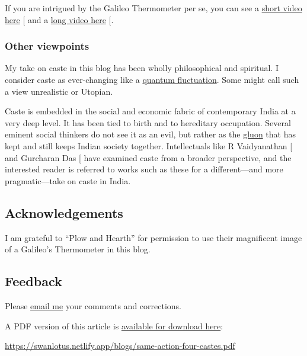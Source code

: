 \documentclass[
  a4paper,
]{article}
\begin{document}
If you are intrigued by the Galileo Thermometer per se, you can see a
\href{https://youtube.com/shorts/kkQ1TFr4apg?si=V7W3fbIZLpQ2p4ud}{short
video here} {[}\citeproc{ref-galileo-YT-short}{1}{]} and a
\href{https://www.youtube.com/watch?v=XeSlFxOHW6A}{long video here}
{[}\citeproc{ref-galileo-YT-long}{2}{]}.

\subsubsection{Other viewpoints}\label{other-viewpoints}

My take on caste in this blog has been wholly philosophical and
spiritual. I consider caste as ever-changing like a
\href{https://en.wikipedia.org/wiki/Quantum_fluctuation}{quantum
fluctuation}. Some might call such a view unrealistic or Utopian.

Caste is embedded in the social and economic fabric of contemporary
India at a very deep level. It has been tied to birth and to hereditary
occupation. Several eminent social thinkers do not see it as an evil,
but rather as the \href{https://en.wikipedia.org/wiki/Gluon}{gluon} that
has kept and still keeps Indian society together. Intellectuals like R
Vaidyanathan {[}\citeproc{ref-rv-caste}{3}{]} and Gurcharan Das
{[}\citeproc{ref-das-dharma}{4}{]} have examined caste from a broader
perspective, and the interested reader is referred to works such as
these for a different---and more pragmatic---take on caste in India.

\subsection{Acknowledgements}\label{acknowledgements}

I am grateful to ``Plow and Hearth'' for permission to use their
magnificent image of a Galileo's Thermometer in this blog.

\subsection{Feedback}\label{feedback}

Please \href{mailto:feedback.swanlotus@gmail.com}{email me} your
comments and corrections.

\noindent A PDF version of this article is
\href{./same-action-four-castes.pdf}{available for download here}:

\begin{small}

\begin{sffamily}

\url{https://swanlotus.netlify.app/blogs/same-action-four-castes.pdf}

\end{sffamily}

\end{small}
\end{document}
